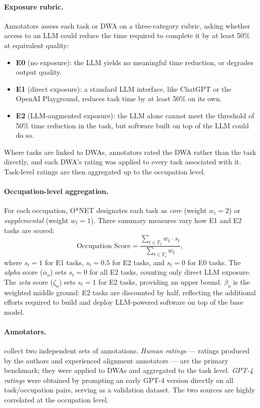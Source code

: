 \documentclass[11pt]{article}
\theoremstyle{plain}
\theoremstyle{remark}
\begin{document}
\paragraph{Exposure rubric.}
Annotators assess each task or DWA on a three-category rubric, asking whether access to an LLM could reduce the time required to complete it by at least 50\% at equivalent quality:
\begin{itemize}[leftmargin=*]
  \item \textbf{E0} (no exposure): the LLM yields no meaningful time reduction, or degrades output quality.
  \item \textbf{E1} (direct exposure): a standard LLM interface, like ChatGPT or the OpenAI Playground, reduces task time by at least 50\% on its own.
  \item \textbf{E2} (LLM-augmented exposure): the LLM alone cannot meet the threshold of 50\% time reduction in the task, but software built on top of the LLM could do so.
\end{itemize}
Where tasks are linked to DWAs, annotators rated the DWA rather than the task directly, and each DWA's rating was applied to every task associated with it.  Task-level ratings are then aggregated up to the occupation level.

\paragraph{Occupation-level aggregation.}
For each occupation, O*NET designates each task as \textit{core} (weight $w_t = 2$) or \textit{supplemental} (weight $w_t = 1$). Three summary measures vary how E1 and E2 tasks are scored:
\begin{equation}
  \text{Occupation Score} = \frac{\displaystyle\sum_{t \in T_o} w_t \cdot s_t}{\displaystyle\sum_{t \in T_o} w_t},
  \label{eq:beta}
\end{equation}
where $s_t = 1$ for E1 tasks, $s_t = 0.5$ for E2 tasks, and $s_t = 0$ for E0 tasks. The \textit{alpha} score ($\alpha_o$) sets $s_t = 0$ for all E2 tasks, counting only direct LLM exposure. The \textit{zeta} score ($\zeta_o$) sets $s_t = 1$ for E2 tasks, providing an upper bound. $\beta_o$ is the weighted middle ground: E2 tasks are discounted by half, reflecting the additional efforts required to build and deploy LLM-powered software on top of the base model.

\paragraph{Annotators.}
\textcite{eloundou2024gpts} collect two independent sets of annotations. \textit{Human ratings} --- ratings produced by the authors and experienced alignment annotators --- are the primary benchmark; they were applied to DWAs and aggregated to the task level. \textit{GPT-4 ratings} were obtained by prompting an early GPT-4 version directly on all task/occupation pairs, serving as a validation dataset. The two sources are highly correlated at the occupation level.
\end{document}
